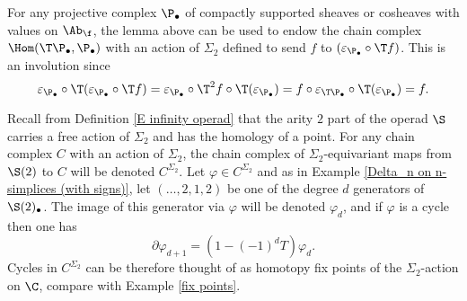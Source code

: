 \documentclass[main.tex]{subfiles}
\begin{document}
\begin{remark}\label{S_2 action on Hom(T,)}
For any projective complex $\P_\bullet$ of compactly supported sheaves or cosheaves with values on $\Ab_{\f}$, the lemma above can be used to endow the chain complex $\Hom(\T\P_\bullet,\P_\bullet)$ with an action of $\Sigma_2$ defined to send $f$ to $(\varepsilon_{\P_\bullet}\circ\T f)$. This is an involution since
$$\varepsilon_{\P_\bullet}\circ\T(\varepsilon_{\P_\bullet}\circ\T f)=\varepsilon_{\P_\bullet}\circ\T^2 f\circ\T(\varepsilon_{\P_\bullet})=
f\circ\varepsilon_{\T\P_\bullet}\circ\T(\varepsilon_{\P_\bullet})=f.$$
\end{remark}

\begin{notation}\label{homotopy fix points}
Recall from Definition \ref{E infinity operad} that the arity $2$ part of the operad $\S$ carries a free action of $\Sigma_2$ and has the homology of a point. For any chain complex $C$ with an action of $\Sigma_2$, the chain complex of $\Sigma_2$-equivariant maps from $\S(2)$ to $C$ will be denoted $C^{\Sigma_2}$. Let $\varphi\in C^{\Sigma_2}$ and as in Example \ref{Delta_n on n-simplices (with signs)}, let $(\dotsc,2,1,2)$ be one of the degree $d$ generators of $\S(2)_\bullet$. The image of this generator via $\varphi$ will be denoted $\varphi_d$, and if $\varphi$ is a cycle then one has
$$\partial \varphi_{d+1}=(1-(-1)^{d}T)\varphi_{d}.$$
Cycles in $C^{\Sigma_2}$ can be therefore thought of as homotopy fix points of the $\Sigma_2$-action on $\C$, compare with Example \ref{fix points}.
\end{notation}
\end{document}
